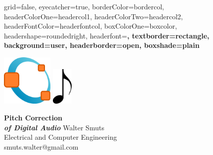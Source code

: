 \documentclass[a1paper,portrait,fontscale=0.42]{baposter}
\begin{document}
\begin{poster}{
	grid=false,
	eyecatcher=true,
	borderColor=bordercol,
	headerColorOne=headercol1,
	headerColorTwo=headercol2,
	headerFontColor=headerfontcol,
	boxColorOne=boxcolor,
	headershape=roundedright,
	headerfont=\Large\sf\bf,
	textborder=rectangle,
	background=user,
	headerborder=open,
  boxshade=plain
}
{
	\begin{minipage}[t][3cm][t]{7.5cm}\centering
	\vfill
	\includegraphics[width=2.5cm]{Octave}\hspace{3cm}
	\includegraphics[width=1cm]{Quaver}\vspace*{3mm}
	\vfill
	\vfill
	\end{minipage}
}
{\sf\bf
	Pitch Correction \\ \large\it of Digital Audio
}
{
	{\smaller\smaller 
	\vspace{1em} Walter Smuts\\
	Electrical and Computer Engineering\\
	smuts.walter@gmail.com}
}
{
	\begin{minipage}[t][3cm][t]{7.5cm}\centering

\end{minipage}}
\end{poster}
\end{document}
